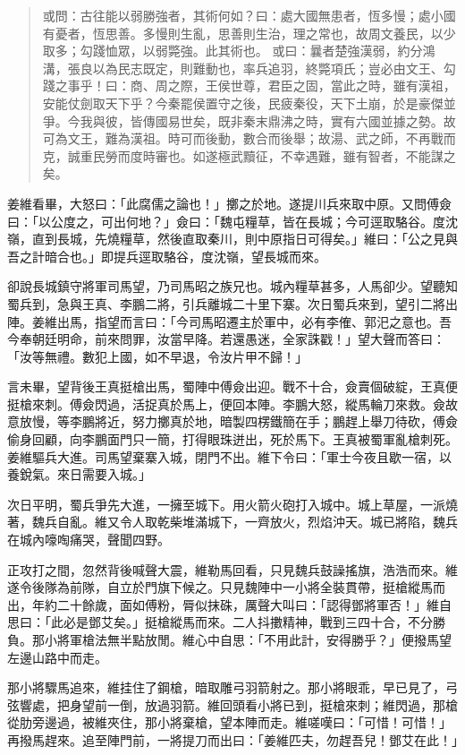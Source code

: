 \begin{quote}
或問：古往能以弱勝強者，其術何如？曰：處大國無患者，恆多慢；處小國有憂者，恆思善。多慢則生亂，思善則生治，理之常也，故周文養民，以少取多；勾踐恤眾，以弱斃強。此其術也。
或曰：曩者楚強漢弱，約分鴻溝，張良以為民志既定，則難動也，率兵追羽，終斃項氏；豈必由文王、勾踐之事乎！曰：商、周之際，王侯世尊，君臣之固，當此之時，雖有漢祖，安能仗劍取天下乎？今秦罷侯置守之後，民疲秦役，天下土崩，於是豪傑並爭。今我與彼，皆傳國易世矣，既非秦末鼎沸之時，實有六國並據之勢。故可為文王，難為漢祖。時可而後動，數合而後舉；故湯、武之師，不再戰而克，誠重民勞而度時審也。如遂極武黷征，不幸遇難，雖有智者，不能謀之矣。
\end{quote}

姜維看畢，大怒曰：「此腐儒之論也！」擲之於地。遂提川兵來取中原。又問傅僉曰：「以公度之，可出何地？」僉曰：「魏屯糧草，皆在長城；今可逕取駱谷。度沈嶺，直到長城，先燒糧草，然後直取秦川，則中原指日可得矣。」維曰：「公之見與吾之計暗合也。」即提兵逕取駱谷，度沈嶺，望長城而來。

卻說長城鎮守將軍司馬望，乃司馬昭之族兄也。城內糧草甚多，人馬卻少。望聽知蜀兵到，急與王真、李鵬二將，引兵離城二十里下寨。次日蜀兵來到，望引二將出陣。姜維出馬，指望而言曰：「今司馬昭遷主於軍中，必有李傕、郭汜之意也。吾今奉朝廷明命，前來問罪，汝當早降。若還愚迷，全家誅戳！」望大聲而答曰：「汝等無禮。數犯上國，如不早退，令汝片甲不歸！」

言未畢，望背後王真挺槍出馬，蜀陣中傅僉出迎。戰不十合，僉賣個破綻，王真便挺槍來刺。傅僉閃過，活捉真於馬上，便回本陣。李鵬大怒，縱馬輪刀來救。僉故意放慢，等李鵬將近，努力擲真於地，暗製四楞鐵簡在手；鵬趕上舉刀待砍，傅僉偷身回顧，向李鵬面門只一簡，打得眼珠迸出，死於馬下。王真被蜀軍亂槍刺死。姜維驅兵大進。司馬望棄寨入城，閉門不出。維下令曰：「軍士今夜且歇一宿，以養銳氣。來日需要入城。」

次日平明，蜀兵爭先大進，一擁至城下。用火箭火砲打入城中。城上草屋，一派燒著，魏兵自亂。維又令人取乾柴堆滿城下，一齊放火，烈焰沖天。城已將陷，魏兵在城內嚎啕痛哭，聲聞四野。

正攻打之間，忽然背後喊聲大震，維勒馬回看，只見魏兵鼓譟搖旗，浩浩而來。維遂令後隊為前隊，自立於門旗下候之。只見魏陣中一小將全裝貫帶，挺槍縱馬而出，年約二十餘歲，面如傅粉，脣似抹硃，厲聲大叫曰：「認得鄧將軍否！」維自思曰：「此必是鄧艾矣。」挺槍縱馬而來。二人抖擻精神，戰到三四十合，不分勝負。那小將軍槍法無半點放閒。維心中自思：「不用此計，安得勝乎？」便撥馬望左邊山路中而走。

那小將驟馬追來，維挂住了鋼槍，暗取雕弓羽箭射之。那小將眼乖，早已見了，弓弦響處，把身望前一倒，放過羽箭。維回頭看小將已到，挺槍來刺；維閃過，那槍從肋旁邊過，被維夾住，那小將棄槍，望本陣而走。維嗟嘆曰：「可惜！可惜！」再撥馬趕來。追至陣門前，一將提刀而出曰：「姜維匹夫，勿趕吾兒！鄧艾在此！」

